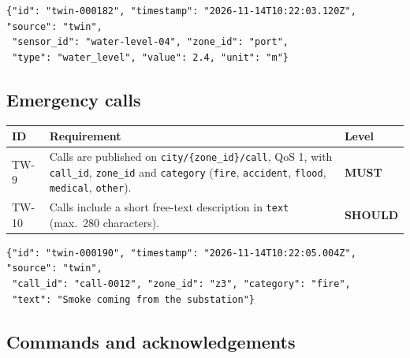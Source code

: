 \documentclass[11pt,a4paper]{article}
\newcommand{\code}[1]{\texttt{#1}}
\newcommand{\MUST}{\textbf{\textcolor{must}{MUST}}}
\newcommand{\SHOULD}{\textbf{\textcolor{should}{SHOULD}}}
\begin{document}
\begin{lstlisting}[caption={Body of a sensor reading}]
{"id": "twin-000182", "timestamp": "2026-11-14T10:22:03.120Z", "source": "twin",
 "sensor_id": "water-level-04", "zone_id": "port",
 "type": "water_level", "value": 2.4, "unit": "m"}
\end{lstlisting}

\subsection{Emergency calls}

\begin{longtable}{@{}l p{10.9cm} l@{}}
\toprule
\textbf{ID} & \textbf{Requirement} & \textbf{Level} \\
\midrule
\endhead
TW-9 & Calls are published on \code{city/\allowbreak \{zone\_id\}/\allowbreak call}, QoS 1, with \code{call\_id}, \code{zone\_id} and \code{category} (\code{fire}, \code{accident}, \code{flood}, \code{medical}, \code{other}). & \MUST \\
TW-10 & Calls include a short free-text description in \code{text} (max.\ 280 characters). & \SHOULD \\
\bottomrule
\end{longtable}

\begin{lstlisting}[caption={Body of an emergency call}]
{"id": "twin-000190", "timestamp": "2026-11-14T10:22:05.004Z", "source": "twin",
 "call_id": "call-0012", "zone_id": "z3", "category": "fire",
 "text": "Smoke coming from the substation"}
\end{lstlisting}

\subsection{Commands and acknowledgements}
\end{document}
